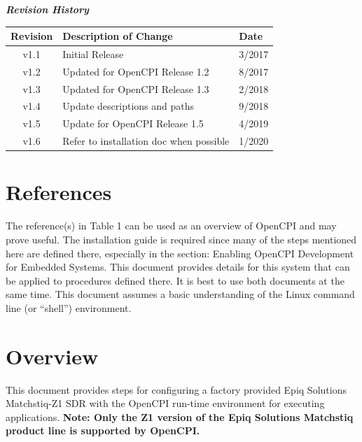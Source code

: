 \newpage

	\begin{center}
	\textit{\textbf{Revision History}}
		\begin{table}[H]
		\label{table:revisions} %
			\begin{tabularx}{\textwidth}{|c|X|l|}
			\hline
			\rowcolor{blue}
			\textbf{Revision} & \textbf{Description of Change} & \textbf{Date} \\
		    \hline
            v1.1 & Initial Release & 3/2017 \\
            \hline
            v1.2 & Updated for OpenCPI Release 1.2 & 8/2017 \\
            \hline
            v1.3 & Updated for OpenCPI Release 1.3 & 2/2018 \\
            \hline
            v1.4 & Update descriptions and paths & 9/2018 \\
            \hline
            v1.5 & Update  for OpenCPI Release 1.5 & 4/2019 \\
            \hline
            v1.6 & Refer to installation doc when possible & 1/2020 \\
			\hline
			\end{tabularx}
		\end{table}
	\end{center}

\newpage

\tableofcontents

\newpage

\section{References}
The reference(s) in Table 1 can be used as an overview of OpenCPI and may prove useful.  The installation guide is required since many of the steps mentioned here are defined there, especially in the section:  Enabling OpenCPI Development for Embedded Systems.  This document provides details for this system that can be applied to procedures defined there.  It is best to use both documents at the same time.  This document assumes a basic understanding of the Linux command line (or ``shell'') environment.  
\def\refcapbottom{}


\section{Overview}
This document provides steps for configuring a factory provided Epiq Solutions Matchstiq-Z1 SDR with the OpenCPI run-time environment for executing applications. \textbf{Note: Only the Z1 version of the Epiq Solutions Matchstiq product line is supported by OpenCPI.}

